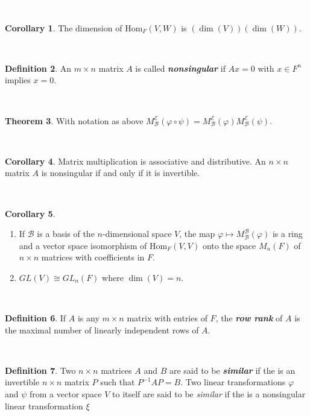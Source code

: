 \documentclass{article}
\theoremstyle{definition}
\newtheorem{thm}{Theorem}[section]
\newtheorem{cor}[thm]{Corollary}
\newtheorem{defn}[thm]{Definition}
\newcommand{\nl}{\textcolor{white}{nothing}}
\newcommand{\inv}{^{-1}}
\newcommand{\vphi}{\varphi}
\newcommand{\Hom}{\text{Hom}}
\newcommand{\BB}{\mathcal{B}}
\newcommand{\EE}{\mathcal{E}}
\begin{document}
\nl

\begin{cor}
The dimension of $\Hom_F(V,W)$ is $(\dim(V))(\dim(W))$.
\end{cor}

\nl

\begin{defn}
An $m\times n$ matrix $A$ is called \textit{\textbf{nonsingular}} if $Ax = 0$ with $x\in F^n$ implies $x = 0$.
\end{defn}

\nl

\begin{thm}
With notation as above $M_\BB^\EE(\vphi\circ \psi) = M_\BB^\EE(\vphi) M_\BB^\EE(\psi)$.
\end{thm}

\nl

\begin{cor}
Matrix multiplication is associative and distributive. An $n\times n$ matrix $A$ is nonsingular if and only if it is invertible.
\end{cor}

\nl

\begin{cor}\nl
\begin{enumerate}
\item If $\BB$ is a basis of the $n$-dimensional space $V$, the map $\vphi\mapsto M_\BB^\BB(\vphi)$ is a ring and a vector space isomorphism of $\Hom_F(V,V)$ onto the space $M_n(F)$ of $n\times n$ matrices with coefficients in $F$.
\item $GL(V)\cong GL_n(F)$ where $\dim(V) = n$. 
\end{enumerate}
\end{cor}

\nl

\begin{defn}
If $A$ is any $m\times n$ matrix with entries of $F$, the \textit{\textbf{row rank}} of $A$ is the maximal number of linearly independent rows of $A$.
\end{defn}

\nl

\begin{defn}
Two $n\times n$ matrices $A$ and $B$ are said to be \textit{\textbf{similar}} if the is an invertible $n\times n$ matrix $P$ such that $P\inv A P = B$. Two linear transformations $\vphi$ and $\psi$ from a vector space $V$ to itself are said to be \textit{similar} if the is a nonsingular linear transformation $\xi$
\end{defn}
\end{document}
